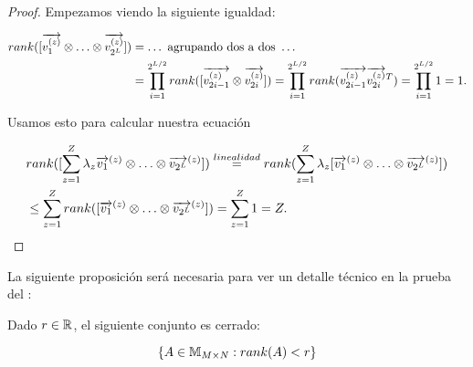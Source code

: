 \begin{proof}

    Empezamos viendo la siguiente igualdad:

    \begin{equation}
        \begin{split}
            rank([\nv{v_1^{(z)}} \otimes \ldots \otimes \nv{v_{2^L}^{(z)}}]) &= \ldots \text{  agrupando dos a dos   } \ldots \\
            &= \prod_{i = 1}^{2^{L/2}} rank([\nv{v_{2i - 1}^{(z)}} \otimes\nv{v_{2i}^{(z)}}]) = \prod_{i = 1}^{2^{L/2}} rank(\nv{v_{2i - 1}^{(z)}} \nv{v_{2i}^{(z)}}^T) = \prod_{i = 1}^{2^{L/2}} 1 = 1.
        \end{split}
    \end{equation}

    Usamos esto para calcular nuestra ecuación

    \begin{equation}
        \begin{split}
            &rank([\sum_{z = 1}^Z \lambda_z \nv{v_1}^{(z)} \otimes \ldots \otimes \nv{v_{2^L}}^{(z)}]) \encima{=}{linealidad} rank(\sum_{z = 1}^Z \lambda_z [\nv{v_1}^{(z)} \otimes \ldots \otimes \nv{v_{2^L}}^{(z)}]) \\
            &\leq \sum_{z = 1}^Z rank([\nv{v_1}^{(z)} \otimes \ldots \otimes \nv{v_{2^L}}^{(z)}]) = \sum_{z = 1}^Z 1 = Z.
        \end{split}
    \end{equation}
\end{proof}

La siguiente proposición será necesaria para ver un detalle técnico en la prueba del :

\begin{proposicion}
    Dado $r \in \R$, el siguiente conjunto es cerrado:

    \begin{equation}
        \conjunto{A \in \espaciomatrices{M}{N}: rank(A) < r }
    \end{equation}
\end{proposicion}

